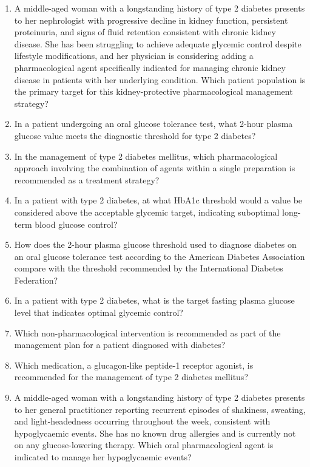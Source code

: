 \begin{enumerate}
\item A middle-aged woman with a longstanding history of type 2 diabetes presents to her nephrologist with progressive decline in kidney function, persistent proteinuria, and signs of fluid retention consistent with chronic kidney disease. She has been struggling to achieve adequate glycemic control despite lifestyle modifications, and her physician is considering adding a pharmacological agent specifically indicated for managing chronic kidney disease in patients with her underlying condition. Which patient population is the primary target for this kidney-protective pharmacological management strategy?

\item In a patient undergoing an oral glucose tolerance test, what 2-hour plasma glucose value meets the diagnostic threshold for type 2 diabetes?

\item In the management of type 2 diabetes mellitus, which pharmacological approach involving the combination of agents within a single preparation is recommended as a treatment strategy?

\item In a patient with type 2 diabetes, at what HbA1c threshold would a value be considered above the acceptable glycemic target, indicating suboptimal long-term blood glucose control?

\item How does the 2-hour plasma glucose threshold used to diagnose diabetes on an oral glucose tolerance test according to the American Diabetes Association compare with the threshold recommended by the International Diabetes Federation?

\item In a patient with type 2 diabetes, what is the target fasting plasma glucose level that indicates optimal glycemic control?

\item Which non-pharmacological intervention is recommended as part of the management plan for a patient diagnosed with diabetes?

\item Which medication, a glucagon-like peptide-1 receptor agonist, is recommended for the management of type 2 diabetes mellitus?

\item A middle-aged woman with a longstanding history of type 2 diabetes presents to her general practitioner reporting recurrent episodes of shakiness, sweating, and light-headedness occurring throughout the week, consistent with hypoglycaemic events. She has no known drug allergies and is currently not on any glucose-lowering therapy. Which oral pharmacological agent is indicated to manage her hypoglycaemic events?


\end{enumerate}

